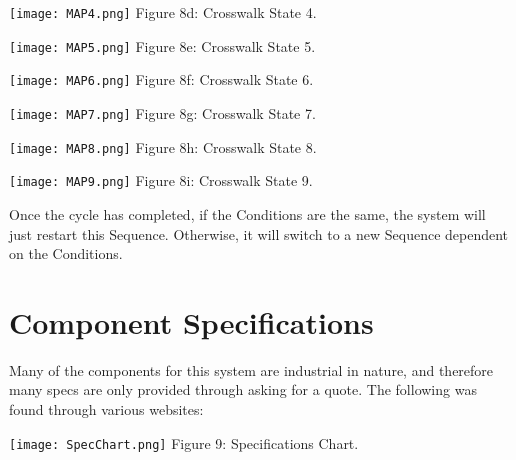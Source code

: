 \documentclass{article}
\begin{document}
\begin{multicols}{3}
\begin{center}
\texttt{[image: MAP4.png]}
\scriptsize{
Figure 8d: Crosswalk State 4.
}
\end{center}

\begin{center}
\texttt{[image: MAP5.png]}
\scriptsize{
Figure 8e: Crosswalk State 5.
}
\end{center}

\begin{center}
\texttt{[image: MAP6.png]}
\scriptsize{
Figure 8f: Crosswalk State 6.
}
\end{center}

\end{multicols}

\begin{multicols}{3}
\begin{center}
\texttt{[image: MAP7.png]}
\scriptsize{
Figure 8g: Crosswalk State 7.
}
\end{center}

\begin{center}
\texttt{[image: MAP8.png]}
\scriptsize{
Figure 8h: Crosswalk State 8.
}
\end{center}

\begin{center}
\texttt{[image: MAP9.png]}
\scriptsize{
Figure 8i: Crosswalk State 9.
}
\end{center}


\end{multicols}

Once the cycle has completed, if the Conditions are the same, the system will just restart this Sequence. Otherwise, it will switch to a new Sequence dependent on the Conditions. 

\section{Component Specifications}
Many of the components for this system are industrial in nature, and therefore many specs are only provided through asking for a quote. The following was found through various websites:

\begin{center}
\texttt{[image: SpecChart.png]}
\scriptsize{
Figure 9: Specifications Chart.
}
\end{center}
\end{document}
